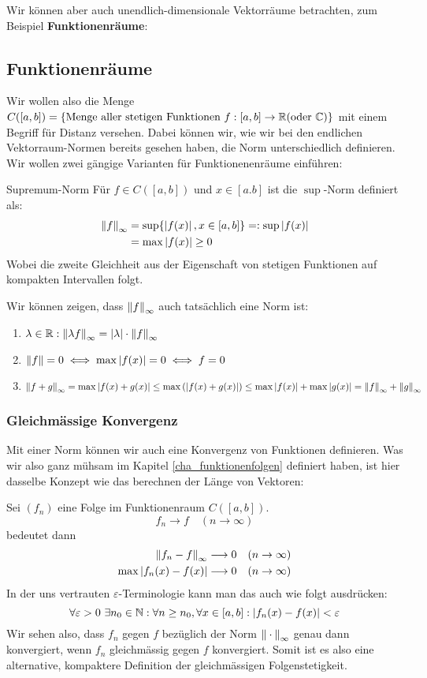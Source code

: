 Wir können aber auch unendlich-dimensionale Vektorräume betrachten, zum Beispiel \textbf{Funktionenräume}:
\subsection{Funktionenräume}
Wir wollen also die Menge $C([a, b]) = \{\text{Menge aller stetigen Funktionen } f : [a,b] \to \mathbb{R} \text{(oder $\mathbb{C}$)}\}$  mit einem Begriff für Distanz versehen. Dabei können wir, wie wir bei den endlichen Vektorraum-Normen bereits gesehen haben, die Norm unterschiedlich definieren. Wir wollen zwei gängige Varianten für Funktionenenräume einführen:

\begin{definition}{Supremum-Norm}{}
Für $f \in C([a,b])$ und $x \in [a.b]$ ist die $\sup$-Norm definiert als:
\begin{align*}
    \left\|f\right\|_\infty &= \sup\{\left|f(x)\right|, x \in [a,b]\} =: \sup\left|f(x)\right|\\
    &= \max\left|f(x)\right| \geq 0
\end{align*}
Wobei die zweite Gleichheit aus der Eigenschaft von stetigen Funktionen auf kompakten Intervallen folgt.
\end{definition}
Wir können zeigen, dass $\left\|f\right\|_\infty$ auch tatsächlich eine Norm ist:
\begin{enumerate}[label=N\arabic*)]
    \item $\lambda \in \mathbb{R} : \left\|\lambda f\right\|_\infty = \left|\lambda\right| \cdot \left\|f\right\|_\infty$ 
    \item $\left\|f\right\| = 0 \iff \max \left|f(x)\right| = 0 \iff f=0$
    \item $\left\|f + g\right\|_\infty = \max \left|f(x) + g(x)\right| \leq \max\left(\left|f(x) + g(x)\right|\right) \leq \max \left|f(x)\right| + \max \left|g(x)\right|  = \left\|f\right\|_\infty + \left\|g\right\|_\infty$
\end{enumerate}

\subsubsection{Gleichmässige Konvergenz}\label{cha_funktionenraum_glm_konvergenz}
Mit einer Norm können wir auch eine Konvergenz von Funktionen definieren. Was wir also ganz mühsam im Kapitel \ref{cha_funktionenfolgen} definiert haben, ist hier dasselbe Konzept wie das berechnen der Länge von Vektoren:

Sei $(f_n)$ eine Folge im Funktionenraum $C([a,b])$.
$$ f_n \to f \quad (n \to \infty)$$
bedeutet dann
\begin{align*}
    \left\|f_n - f\right\|_\infty &\longrightarrow 0 \quad (n \to \infty)\\
    \max \left|f_n(x) -f(x)\right| &\longrightarrow 0 \quad (n \to \infty)
\end{align*}
In der uns vertrauten $\varepsilon$-Terminologie kann man das auch wie folgt ausdrücken:
$$\forall \varepsilon >0\ \exists n_0 \in \mathbb{N} : \forall n\geq n_0, \forall x \in [a,b]: \left|f_n(x) - f(x)\right| < \varepsilon$$
Wir sehen also, dass $f_n$ gegen $f$ bezüglich der Norm $\left\|\:\cdot\:\right\|_\infty$ genau dann konvergiert, wenn $f_n$ gleichmässig gegen $f$ konvergiert. Somit ist es also eine alternative, kompaktere Definition der gleichmässigen Folgenstetigkeit.

